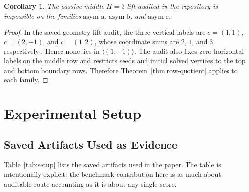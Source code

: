 \documentclass[11pt]{article}
\newtheorem{corollary}[theorem]{Corollary}
\theoremstyle{definition}
\begin{document}
\begin{corollary}
\label{cor:h3}
The passive-middle $H=3$ lift audited in the repository is impossible on the families $\mathrm{asym\_a}$, $\mathrm{asym\_b}$, and $\mathrm{asym\_c}$.
\end{corollary}

\begin{proof}
In the saved geometry-lift audit, the three vertical labels are $c=(1,1)$, $c=(2,-1)$, and $c=(1,2)$, whose coordinate sums are $2$, $1$, and $3$ respectively \citep{archivara_geometry_lift}. Hence none lies in $\langle(1,-1)\rangle$. The audit also fixes zero horizontal labels on the middle row and restricts seeds and initial solved vertices to the top and bottom boundary rows. Therefore Theorem~\ref{thm:row-quotient} applies to each family.
\end{proof}

\section{Experimental Setup}
\label{sec:setup}

\subsection{Saved Artifacts Used as Evidence}

Table~\ref{tab:setup} lists the saved artifacts used in the paper. The table is intentionally explicit: the benchmark contribution here is as much about auditable route accounting as it is about any single score.
\end{document}
